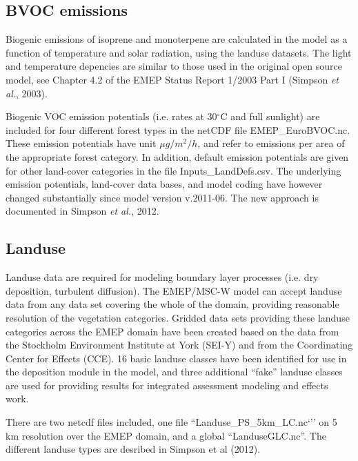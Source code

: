 \documentclass[a4paper,12pt]{report}
\begin{document}
\subsection{BVOC emissions}
Biogenic emissions of isoprene and monoterpene are calculated in the
model as a function of temperature and solar radiation, using the landuse
datasets. The light and temperature depencies are similar to those
used in the original open source model, see 
Chapter 4.2 of the EMEP Status Report 1/2003 Part I (Simpson
{\sl et al.}, 2003).

Biogenic VOC emission potentials (i.e. rates at 30$^\circ$C and full sunlight)
are included for four different forest types in the netCDF file 
EMEP\_EuroBVOC.nc. These emission potentials have unit $\mu g/m^{2} /h$, and
refer to emissions per area of the appropriate forest category. In 
addition, default emission potentials are given for other
land-cover categories in the file Inputs\_LandDefs.csv. 
The underlying emission potentials, land-cover data bases, and model
coding have however changed substantially since model version v.2011-06. The new approach
is documented in Simpson {\sl et al.}, 2012.

\subsection{Landuse}

Landuse data are required for modeling boundary layer processes
(i.e. dry deposition, turbulent diffusion).
The EMEP/MSC-W model can accept landuse data from any
data set covering the whole of the domain, providing reasonable 
resolution of the vegetation categories. Gridded data sets providing
these landuse categories across the EMEP domain have been created
based on the data from the Stockholm Environment Institute at York 
(SEI-Y) and from the Coordinating Center for Effects (CCE). 
16 basic landuse classes have been identified for use in the
deposition module in the model, and three additional ``fake'' landuse
classes are used for providing results for integrated assessment
modeling and effects work.

There are two netcdf files included, one file ``Landuse\_PS\_5km\_LC.nc`'' on 5 km resolution over the EMEP domain, and a global ``LanduseGLC.nc''. The different landuse types are desribed in Simpson et al (2012). 

% 
\end{document}
